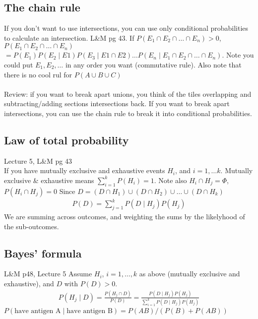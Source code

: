 \subsection{The chain rule}
If you don't want to use intersections, you can use only conditional probabilities to calculate an intersection.  {\tiny L\&M pg 43.}
If $P(E_1 \cap E_2 \cap \dots \cap E_n) > 0$, \hfill \\
$P(E_1 \cap E_2 \cap \dots \cap E_n)$  \hfill \\ 
$= P(E_1)P(E_2 \mid E1)P(E_3 \mid E1 \cap E2) \dots P(E_n \mid E_1 \cap E_2 \cap \dots \cap E_n)$.
 Note you could put $E_1, E_2, \dots$ in any order you want (commutative rule).  Also note that there is no cool rul for $P(A \cup B \cup C)$ \hfill \\ 
 \hfill \\
Review: if you want to break apart unions, you think of the tiles overlapping and subtracting/adding sections intersections back.  If you want to break apart intersections, you can use the chain rule to break it into conditional probabilities.  
 \hfill \\
 
 \subsection{Law of total probability} {\tiny Lecture 5, L\&M pg 43}   \hfill \\
 If you have mutually exclusive and exhaustive events $H_i$, and $i = 1, \dots k$.  Mutually exclusive \& exhaustive means $\sum_{i=1}^k P(H_i) = 1$.  Note also $H_i \cap H_j = \Phi$, $P(H_i \cap H_j) = 0$  
 Since $D = (D \cap H_1) \cup (D \cap H_2) \cup \dots \cup  (D \cap H_k)$
	\begin{align*}
 		P(D) = \sum_{j=1}^k P(D \mid H_j) P(H_j) 
  	\end{align*}
We are summing across outcomes, and weighting the sums by the likelyhood of the sub-outcomes.
 
 \subsection{Bayes' formula} {\tiny L\&M p48, Lecture 5}
 Assume $H_i$, $i = 1, \dots, k$ as above (mutually exclusive and exhaustive), and $D$ with $P(D) > 0$.
 	\begin{align*}
		P(H_j \mid D) = \frac{P(H_j \cap D)}{P(D)} = \frac{P(D \mid H_j) P(H_j) }{\sum_{i=1}^k P(D \mid H_j) P(H_j) }
	\end{align*}
$P(\mbox{have antigen A} \mid \mbox{have antigen B}) = P(AB)/(P(B) + P(AB)) $  \hfill \\
 \hfill \\
 
